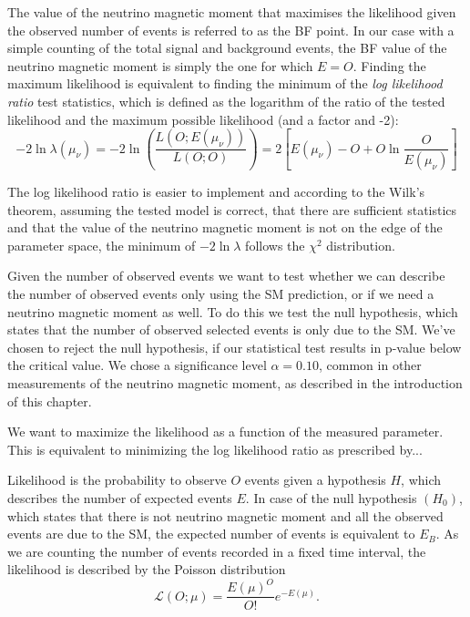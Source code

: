 The value of the neutrino magnetic moment that maximises the likelihood given the observed number of events is referred to as the \gls{BF} point. In our case with a simple counting of the total signal and background events, the \gls{BF} value of the neutrino magnetic moment is simply the one for which $E=O$. Finding the maximum likelihood is equivalent to finding the minimum of the \textit{log likelihood ratio} test statistics, which is defined as the logarithm of the ratio of the tested likelihood and the maximum possible likelihood (and a factor and -2):
\begin{equation}
-2\ln\lambda\left(\mu_\nu\right)=
-2\ln\left(\frac{L\left(O;E\left(\mu_\nu\right)\right)}{L\left(O;O\right)}\right)=
2\left[E\left(\mu_\nu\right)-O+O\ln\frac{O}{E\left(\mu_\nu\right)}\right]
\end{equation}

The log likelihood ratio is easier to implement and according to the Wilk's theorem, assuming the tested model is correct, that there are sufficient statistics and that the value of the neutrino magnetic moment is not on the edge of the parameter space, the minimum of $-2\ln\lambda$ follows the $\chi^2$ distribution.

Given the number of observed events we want to test whether we can describe the number of observed events only using the \gls{SM} prediction, or if we need a neutrino magnetic moment as well. To do this we test the null hypothesis, which states that the number of observed selected events is only due to the \gls{SM}. We've chosen to reject the null hypothesis, if our statistical test results in p-value below the critical value. We chose a significance level $\alpha=0.10$, common in other measurements of the neutrino magnetic moment, as described in the introduction of this chapter.


We want to maximize the likelihood as a function of the measured parameter. This is equivalent to minimizing the log likelihood ratio as prescribed by...

Likelihood is the probability to observe $O$ events given a hypothesis $H$, which describes the number of expected events $E$. In case of the null hypothesis $\left(H_0\right)$, which states that there is not neutrino magnetic moment and all the observed events are due to the \gls{SM}, the expected number of events is equivalent to $E_B$. As we are counting the number of events recorded in a fixed time interval, the likelihood is described by the Poisson distribution
\begin{equation}
\mathcal{L}\left(O;\mu\right)=\frac{E\left(\mu\right)^{O}}{O!}e^{-E\left(\mu\right)}.
\end{equation}

